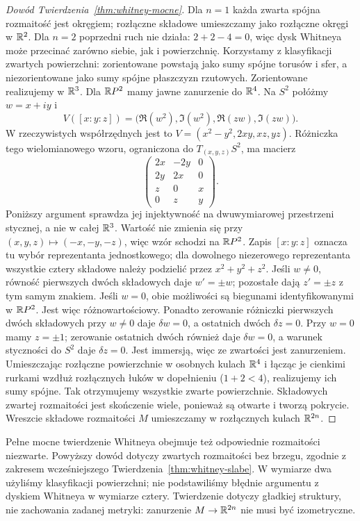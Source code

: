 \begin{proof}[Dowód Twierdzenia~\ref{thm:whitney-mocne}]
Dla $n=1$ każda zwarta spójna
rozmaitość jest okręgiem;
rozłączne składowe umieszczamy
jako rozłączne okręgi w $\mathbb{R}^2$.
Dla $n=2$ poprzedni ruch nie
działa: $2+2-4=0$, więc dysk
Whitneya może przecinać
zarówno siebie, jak i powierzchnię.
Korzystamy z klasyfikacji
zwartych powierzchni:
zorientowane powstają jako
sumy spójne torusów i sfer,
a niezorientowane jako sumy
spójne płaszczyzn rzutowych.
Zorientowane realizujemy w $\mathbb{R}^3$.
Dla $\mathbb{R} P^2$ mamy jawne zanurzenie
do $\mathbb{R}^4$. Na $S^2$ połóżmy
$w=x+iy$ i
\[
 V([x:y:z])
   =\bigl(\Re(w^2),
           \Im(w^2),
           \Re(zw),
           \Im(zw)\bigr).
\]
W rzeczywistych współrzędnych jest to
$V=(x^2-y^2,2xy,xz,yz)$.
Różniczka tego wielomianowego wzoru, ograniczona
do $T_{(x,y,z)}S^2$, ma macierz
\[
 \begin{pmatrix}
  2x&-2y&0\\ 2y&2x&0\\ z&0&x\\0&z&y
 \end{pmatrix}.
\]
Poniższy argument sprawdza jej injektywność
na dwuwymiarowej przestrzeni stycznej, a nie w całej $\mathbb{R}^3$.
Wartość nie zmienia się przy
$(x,y,z)\mapsto(-x,-y,-z)$,
więc wzór schodzi na $\mathbb{R} P^2$. Zapis $[x:y:z]$
oznacza tu wybór reprezentanta jednostkowego;
dla dowolnego niezerowego reprezentanta wszystkie
cztery składowe należy podzielić przez $x^2+y^2+z^2$.
Jeśli $w\ne0$, równość pierwszych
dwóch składowych daje $w'=\pm w$;
pozostałe dają $z'=\pm z$
z tym samym znakiem. Jeśli $w=0$,
obie możliwości są biegunami
identyfikowanymi w $\mathbb{R} P^2$.
Jest więc różnowartościowy.
Ponadto zerowanie różniczki
pierwszych dwóch składowych
przy $w\ne0$ daje $\delta w=0$,
a ostatnich dwóch $\delta z=0$.
Przy $w=0$ mamy $z=\pm1$;
zerowanie ostatnich dwóch
również daje $\delta w=0$,
a warunek styczności do $S^2$
daje $\delta z=0$. Jest immersją,
więc ze zwartości jest zanurzeniem.
Umieszczając rozłączne powierzchnie
w osobnych kulach $\mathbb{R}^4$ i łącząc
je cienkimi rurkami wzdłuż
rozłącznych łuków w dopełnieniu
($1+2<4$), realizujemy ich
sumy spójne. Tak otrzymujemy
wszystkie zwarte powierzchnie.
Składowych zwartej rozmaitości jest skończenie
wiele, ponieważ są otwarte i tworzą pokrycie.
Wreszcie składowe rozmaitości $M$ umieszczamy w rozłącznych
kulach $\mathbb{R}^{2n}$.
\end{proof}

\begin{uwaga}
Pełne mocne twierdzenie Whitneya
obejmuje też odpowiednie rozmaitości
niezwarte. Powyższy dowód dotyczy
zwartych rozmaitości bez brzegu,
zgodnie z zakresem wcześniejszego
Twierdzenia~\ref{thm:whitney-slabe}.
W wymiarze dwa użyliśmy
klasyfikacji powierzchni; nie
podstawiliśmy błędnie argumentu
z dyskiem Whitneya w wymiarze cztery.
Twierdzenie dotyczy gładkiej struktury,
nie zachowania zadanej metryki:
zanurzenie $M\to\mathbb{R}^{2n}$ nie musi
być izometryczne.
\end{uwaga}

